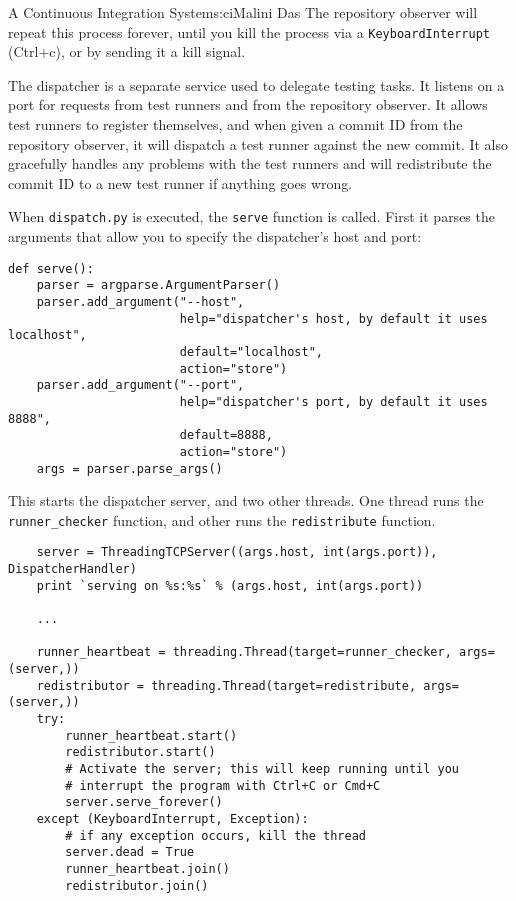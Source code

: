 \begin{aosachapter}{A Continuous Integration System}{s:ci}{Malini Das}
The repository observer will repeat this process forever, until you kill
the process via a \newline \texttt{KeyboardInterrupt} (Ctrl+c), or by
sending it a kill signal.

\label{the-dispatcher-dispatcher.py}

The dispatcher is a separate service used to delegate testing tasks. It
listens on a port for requests from test runners and from the repository
observer. It allows test runners to register themselves, and when given
a commit ID from the repository observer, it will dispatch a test runner
against the new commit. It also gracefully handles any problems with the
test runners and will redistribute the commit ID to a new test runner if
anything goes wrong.

When \texttt{dispatch.py} is executed, the \texttt{serve} function is
called. First it parses the arguments that allow you to specify the
dispatcher's host and port:

\begin{verbatim}
def serve():
    parser = argparse.ArgumentParser()
    parser.add_argument("--host",
                        help="dispatcher's host, by default it uses localhost",
                        default="localhost",
                        action="store")
    parser.add_argument("--port",
                        help="dispatcher's port, by default it uses 8888",
                        default=8888,
                        action="store")
    args = parser.parse_args()
\end{verbatim}

This starts the dispatcher server, and two other threads. One thread
runs the \texttt{runner\_checker} function, and other runs the
\texttt{redistribute} function.

\begin{verbatim}
    server = ThreadingTCPServer((args.host, int(args.port)), DispatcherHandler)
    print `serving on %s:%s` % (args.host, int(args.port))

    ...

    runner_heartbeat = threading.Thread(target=runner_checker, args=(server,))
    redistributor = threading.Thread(target=redistribute, args=(server,))
    try:
        runner_heartbeat.start()
        redistributor.start()
        # Activate the server; this will keep running until you
        # interrupt the program with Ctrl+C or Cmd+C
        server.serve_forever()
    except (KeyboardInterrupt, Exception):
        # if any exception occurs, kill the thread
        server.dead = True
        runner_heartbeat.join()
        redistributor.join()
\end{verbatim}


\end{aosachapter}
